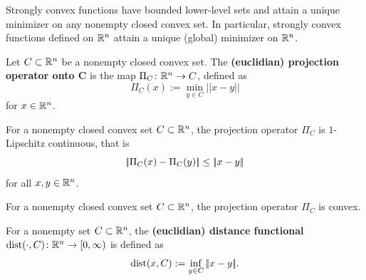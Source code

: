 \begin{proposition}
    \label{prop:strongly-convex-implies-lower-level-sets}
    Strongly convex functions have bounded lower-level sets and attain a unique minimizer
    on any nonempty closed convex set. In particular, strongly convex functions defined on $\mathbb{R}^n$
    attain a unique (global) minimizer on $\mathbb{R}^n$.
\end{proposition}


\begin{definition}
    Let $C\subset\mathbb{R}^n$ be a nonempty closed convex set. The \textbf{(euclidian) projection operator onto C} is the
    map $\Pi_C\colon\mathbb{R}^n\to C$, defined as
    \[
        \Pi_C(x) := \min_{y\in C}|\!| x - y|\!|
    \]
    for $x\in\mathbb{R}^n$.
\end{definition}

\begin{proposition}
    \label{prop:projection-is-lipschitz}
    For a nonempty closed convex set $C\subset\mathbb{R}^n$, the projection operator $\Pi_C$ is $1$-Lipschitz continuous, that is
    \[
        |\!|\Pi_C(x) - \Pi_C(y)|\!| \leq |\!|x - y|\!|
    \]
    for all $x,y\in\mathbb{R}^n$.
\end{proposition}

\begin{proposition}
    \label{prop:projecton-is-convex}
    For a nonempty closed convex set $C\subset\mathbb{R}^n$, the projection operator $\Pi_C$ is convex.
\end{proposition}

\begin{definition}
    For a nonempty set $C\subset\mathbb{R}^n$, the \textbf{(euclidian) distance functional} $\operatorname{dist}(\cdot, C)\colon\mathbb{R}^n\to[0,\infty)$
    is defined as
    \[
        \operatorname{dist}(x, C) := \inf_{y\in C} |\!|x - y|\!|.
    \]
\end{definition}

